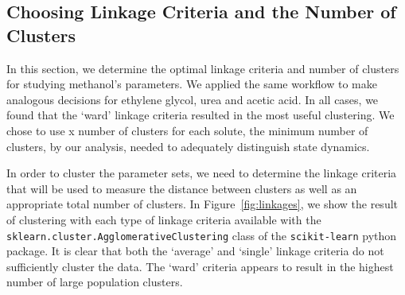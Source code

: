 \documentclass{article}
\begin{document}
  \subsection{Choosing Linkage Criteria and the Number of Clusters}\label{section:nclusters}
  
  In this section, we determine the optimal linkage criteria and number of clusters
  for studying methanol's parameters. We applied the same workflow to make analogous
  decisions for ethylene glycol, urea and acetic acid. In all cases, we found that
  the `ward' linkage criteria resulted in the most useful clustering. We chose to 
  use x number of clusters for each solute, the minimum number of clusters, by our
  analysis, needed to adequately distinguish state dynamics. 
  
  In order to cluster the parameter sets, we need to determine the linkage criteria 
  that will be used to measure the distance between clusters as well as an appropriate
  total number of clusters. In Figure~\ref{fig:linkages}, we show the result of clustering
  with each type of linkage criteria available with the 
  \texttt{sklearn.cluster.AgglomerativeClustering} class of the \texttt{scikit-learn} 
  python package. It is clear that both the `average' and `single' linkage criteria 
  do not sufficiently cluster the data. The `ward' criteria appears to result in the 
  highest number of large population clusters.
  
\end{document}

